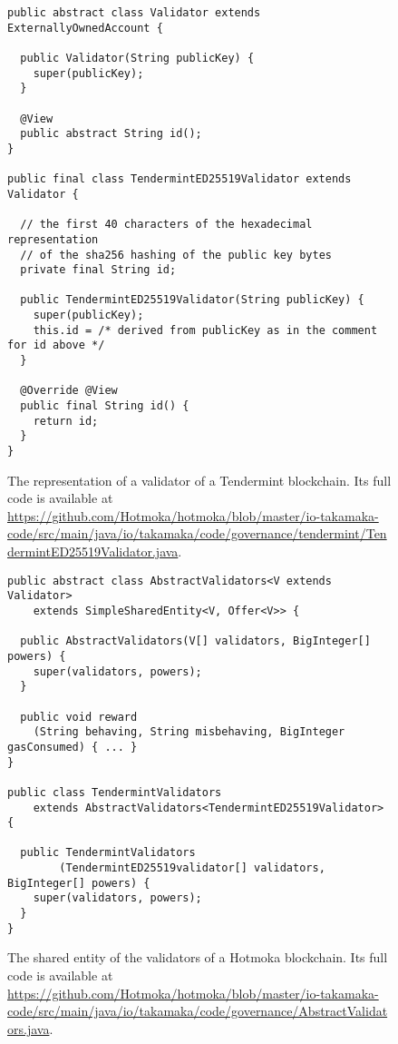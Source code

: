 \begin{figure}[t]
  \begin{center}
    \begin{lstlisting}[language=Takamaka]
public abstract class Validator extends ExternallyOwnedAccount {

  public Validator(String publicKey) {
    super(publicKey);
  }

  @View
  public abstract String id();
}

public final class TendermintED25519Validator extends Validator {

  // the first 40 characters of the hexadecimal representation
  // of the sha256 hashing of the public key bytes
  private final String id;

  public TendermintED25519Validator(String publicKey) {
    super(publicKey);
    this.id = /* derived from publicKey as in the comment for id above */
  }

  @Override @View
  public final String id() {
    return id;
  }
}
    \end{lstlisting}
  \end{center}
  \caption{The representation of a validator of a Tendermint blockchain.
  Its full code is available at \url{https://github.com/Hotmoka/hotmoka/blob/master/io-takamaka-code/src/main/java/io/takamaka/code/governance/tendermint/TendermintED25519Validator.java}.}\label{fig:validator}
\end{figure}

\begin{figure}[t]
  \begin{center}
    \begin{lstlisting}[language=Takamaka]
public abstract class AbstractValidators<V extends Validator>
    extends SimpleSharedEntity<V, Offer<V>> {

  public AbstractValidators(V[] validators, BigInteger[] powers) {
    super(validators, powers);
  }

  public void reward
    (String behaving, String misbehaving, BigInteger gasConsumed) { ... }
}

public class TendermintValidators
    extends AbstractValidators<TendermintED25519Validator> {

  public TendermintValidators
        (TendermintED25519validator[] validators, BigInteger[] powers) {
    super(validators, powers);
  }
}
    \end{lstlisting}
  \end{center}
  \caption{The shared entity of the validators of a Hotmoka blockchain.
  Its full code is available at \url{https://github.com/Hotmoka/hotmoka/blob/master/io-takamaka-code/src/main/java/io/takamaka/code/governance/AbstractValidators.java}.}\label{fig:abstract_validators}
\end{figure}

